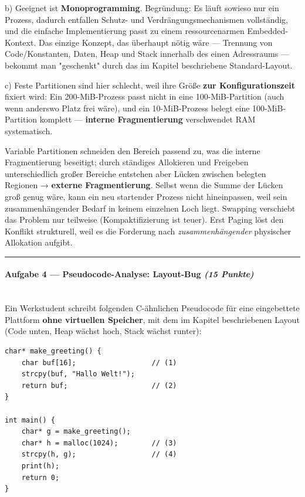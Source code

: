 \documentclass[11pt, a4paper]{article}
\begin{document}
b) Geeignet ist \textbf{Monoprogramming}. Begründung: Es läuft sowieso nur ein Prozess, dadurch entfallen Schutz- und Verdrängungsmechanismen vollständig, und die einfache Implementierung passt zu einem ressourcenarmen Embedded-Kontext. Das einzige Konzept, das überhaupt nötig wäre — Trennung von Code/Konstanten, Daten, Heap und Stack innerhalb des einen Adressraums — bekommt man "geschenkt" durch das im Kapitel beschriebene Standard-Layout.


c) Feste Partitionen sind hier schlecht, weil ihre Größe \textbf{zur Konfigurationszeit} fixiert wird: Ein 200-MiB-Prozess passt nicht in eine 100-MiB-Partition (auch wenn anderswo Platz frei wäre), und ein 10-MiB-Prozess belegt eine 100-MiB-Partition komplett — \textbf{interne Fragmentierung} verschwendet RAM systematisch.

Variable Partitionen schneiden den Bereich passend zu, was die interne Fragmentierung beseitigt; durch ständiges Allokieren und Freigeben unterschiedlich großer Bereiche entstehen aber Lücken zwischen belegten Regionen → \textbf{externe Fragmentierung}. Selbst wenn die Summe der Lücken groß genug wäre, kann ein neu startender Prozess nicht hineinpassen, weil sein zusammenhängender Bedarf in keinem einzelnen Loch liegt. Swapping verschiebt das Problem nur teilweise (Kompaktifizierung ist teuer). Erst Paging löst den Konflikt strukturell, weil es die Forderung nach \textit{zusammenhängender} physischer Allokation aufgibt.



\noindent\textcolor{rulegray}{\rule{\linewidth}{0.4pt}}


\paragraph{Aufgabe 4 — Pseudocode-Analyse: Layout-Bug \textit{(15 Punkte)}}\mbox{}\\[2pt]

Ein Werkstudent schreibt folgenden C-ähnlichen Pseudocode für eine eingebettete Plattform \textbf{ohne virtuellen Speicher}, mit dem im Kapitel beschriebenen Layout (Code unten, Heap wächst hoch, Stack wächst runter):


\begin{lstlisting}
char* make_greeting() {
    char buf[16];                  // (1)
    strcpy(buf, "Hallo Welt!");
    return buf;                    // (2)
}

int main() {
    char* g = make_greeting();
    char* h = malloc(1024);        // (3)
    strcpy(h, g);                  // (4)
    print(h);
    return 0;
}
\end{lstlisting}
\end{document}

